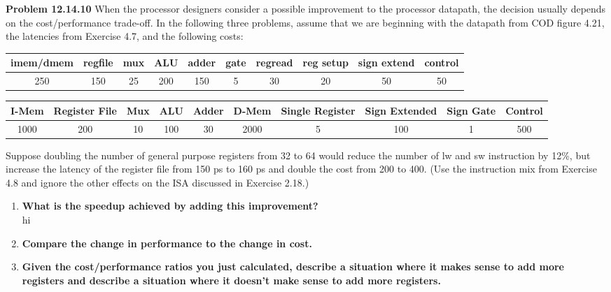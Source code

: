 \documentclass{article}
\begin{document}
    \textbf{Problem 12.14.10} When the processor designers consider a possible improvement to the processor datapath, the decision usually depends on the cost/performance trade-off. In the following three problems, assume that we are beginning with the datapath from COD figure 4.21, the latencies from Exercise 4.7, and the following costs:
    
    \begin{table}[ht]
        \centering
        \resizebox{\textwidth}{!}
        {\begin{tabular}{cccccccccc}
            \hline
            imem/dmem & regfile & mux & ALU & adder & gate & regread & reg setup & sign extend & control\\
            \hline
            250 & 150 & 25 & 200 & 150 & 5 & 30 & 20 & 50 & 50\\
            \hline
        \end{tabular}}
    \end{table}

    \begin{table}[ht]
        \centering
        \resizebox{\textwidth}{!}
        {\begin{tabular}{cccccccccc}
            \hline
            I-Mem & Register File & Mux & ALU & Adder & D-Mem & Single Register & Sign Extended & Sign Gate & Control\\
            \hline
            1000 & 200 & 10 & 100 & 30 & 2000 & 5 & 100 & 1 & 500\\
            \hline
        \end{tabular}}
    \end{table}
    
    \noindent Suppose doubling the number of general purpose registers from 32 to 64 would reduce the number of lw and sw instruction by 12\%, but increase the latency of the register file from 150 ps to 160 ps and double the cost from 200 to 400. (Use the instruction mix from Exercise 4.8 and ignore the other effects on the ISA discussed in Exercise 2.18.)
    \begin{enumerate}[label=(\alph*)]
        \item \textbf{What is the speedup achieved by adding this improvement?}
        \\ hi
        \item \textbf{Compare the change in performance to the change in cost.}
        \item \textbf{Given the cost/performance ratios you just calculated, describe a situation where it makes sense to add more registers and describe a situation where it doesn't make sense to add more registers.}
    \end{enumerate}
\end{document}
